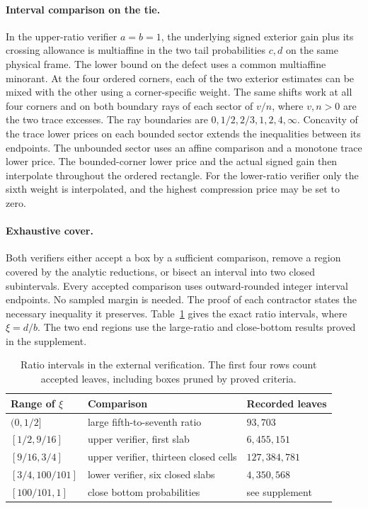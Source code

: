 \documentclass[11pt]{article}
\begin{document}
\paragraph{Interval comparison on the tie.}
In the upper-ratio verifier \(a=b=1\), the underlying signed
exterior gain plus its crossing allowance is multiaffine in the
two tail probabilities \(c,d\) on the same physical frame.
The lower bound on the defect uses a common multiaffine minorant.
At the four ordered corners, each of the two exterior estimates
can be mixed with the other using a corner-specific weight.
The same shifts work at all four corners and on both boundary
rays of each sector of \(v/n\), where \(v,n>0\) are the two trace
excesses. The ray boundaries are \(0,1/2,2/3,1,2,4,\infty\).
Concavity of the trace lower prices on each bounded sector extends
the inequalities between its endpoints. The unbounded sector
uses an affine comparison and a monotone trace lower price.
The bounded-corner lower price and the actual signed gain then
interpolate throughout the ordered rectangle.
For the lower-ratio verifier only the sixth weight is interpolated,
and the highest compression price may be set to zero.

\paragraph{Exhaustive cover.}
Both verifiers either accept a box by a sufficient comparison,
remove a region covered by the analytic reductions, or bisect
an interval into two closed subintervals. Every accepted comparison
uses outward-rounded integer interval endpoints. No sampled margin
is needed. The proof of each contractor states the necessary
inequality it preserves. Table~\ref{tab:cover} gives the exact
ratio intervals, where \(\xi=d/b\). The two end regions use the
large-ratio and close-bottom results proved in the supplement.

\begin{table}[h]
\centering
\begin{tabular}{@{}lll@{}}
\toprule
Range of \(\xi\) & Comparison & Recorded leaves \\
\midrule
\((0,1/2]\) & large fifth-to-seventh ratio & \(93{,}703\) \\
\([1/2,9/16]\) & upper verifier, first slab & \(6{,}455{,}151\) \\
\([9/16,3/4]\) & upper verifier, thirteen closed cells & \(127{,}384{,}781\) \\
\([3/4,100/101]\) & lower verifier, six closed slabs & \(4{,}350{,}568\) \\
\([100/101,1]\) & close bottom probabilities & see supplement \\
\bottomrule
\end{tabular}
\caption{Ratio intervals in the external verification. The first four
rows count accepted leaves, including boxes pruned by proved criteria.}
\label{tab:cover}
\end{table}
\end{document}
